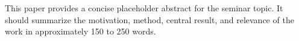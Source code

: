This paper provides a concise placeholder abstract for the seminar topic. It should summarize the motivation, method, central result, and relevance of the work in approximately 150 to 250 words.
